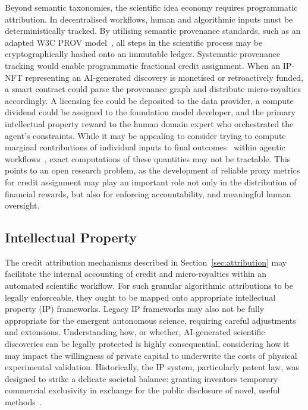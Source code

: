 \documentclass[11pt, a4paper, twocolumn, goog]{google}
\begin{document}
Beyond semantic taxonomies, the scientific idea economy requires programmatic attribution. In decentralised workflows, human and algorithmic inputs must be deterministically tracked. By utilising semantic provenance standards, such as an adapted W3C PROV model~\citep{missier2013w3c, rasheed2026fluent}, all steps in the scientific process may be cryptographically hashed onto an immutable ledger. Systematic provenance tracking would enable programmatic fractional credit assignment. When an IP-NFT representing an AI-generated discovery is monetised or retroactively funded, a smart contract could parse the provenance graph and distribute micro-royalties accordingly. A licensing fee could be deposited to the data provider, a compute dividend could be assigned to the foundation model developer, and the primary intellectual property reward to the human domain expert who orchestrated the agent's constraints. While it may be appealing to consider trying to compute marginal contributions of individual inputs to final outcomes~\citep{ghorbani2019data} within agentic workflows~\citep{he2025contributions}, exact computations of these quantities may not be tractable. This points to an open research problem, as the development of reliable proxy metrics for credit assignment may play an important role not only in the distribution of financial rewards, but also for enforcing accountability, and meaningful human oversight.

\subsection{Intellectual Property}

The credit attribution mechanisms described in Section~\ref{sec:attribution} may facilitate the internal accounting of credit and micro-royalties within an automated scientific workflow. For such granular algorithmic attributions to be legally enforceable, they ought to be mapped onto appropriate intellectual property (IP) frameworks. Legacy IP frameworks may also not be fully appropriate for the emergent autonomous science, requiring careful adjustments and extensions. Understanding how, or whether, AI-generated scientific discoveries can be legally protected is highly consequential, considering how it may impact the willingness of private capital to underwrite the costs of physical experimental validation. Historically, the IP system, particularly patent law, was designed to strike a delicate societal balance: granting inventors temporary commercial exclusivity in exchange for the public disclosure of novel, useful methods~\citep{hettinger1989justifying, himma2008justification}.
\end{document}
